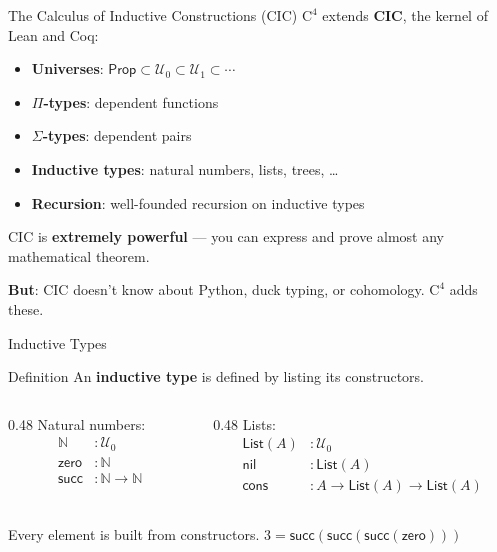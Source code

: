 \documentclass[aspectratio=169,11pt]{beamer}
\newcommand{\Cfour}{\mathrm{C}^4}
\begin{document}
\begin{frame}{The Calculus of Inductive Constructions (CIC)}
$\Cfour$ extends \textbf{CIC}, the kernel of Lean and Coq:

\vspace{0.5em}
\begin{itemize}
\item \textbf{Universes}: $\mathsf{Prop} \subset \mathcal{U}_0 \subset \mathcal{U}_1 \subset \cdots$
\item \textbf{$\Pi$-types}: dependent functions
\item \textbf{$\Sigma$-types}: dependent pairs
\item \textbf{Inductive types}: natural numbers, lists, trees, \ldots
\item \textbf{Recursion}: well-founded recursion on inductive types
\end{itemize}

\vspace{0.5em}
CIC is \textbf{extremely powerful} --- you can express and prove
almost any mathematical theorem.

\textbf{But}: CIC doesn't know about Python, duck typing, or
cohomology.  $\Cfour$ adds these.
\end{frame}

\begin{frame}{Inductive Types}
\begin{block}{Definition}
An \textbf{inductive type} is defined by listing its constructors.
\end{block}

\vspace{0.5em}
\begin{columns}
\begin{column}{0.48\textwidth}
Natural numbers:
\begin{align*}
\mathbb{N} &: \mathcal{U}_0 \\
\mathsf{zero} &: \mathbb{N} \\
\mathsf{succ} &: \mathbb{N} \to \mathbb{N}
\end{align*}
\end{column}
\begin{column}{0.48\textwidth}
Lists:
\begin{align*}
\mathsf{List}(A) &: \mathcal{U}_0 \\
\mathsf{nil} &: \mathsf{List}(A) \\
\mathsf{cons} &: A \to \mathsf{List}(A) \to \mathsf{List}(A)
\end{align*}
\end{column}
\end{columns}

\vspace{0.5em}
Every element is built from constructors.
$3 = \mathsf{succ}(\mathsf{succ}(\mathsf{succ}(\mathsf{zero})))$
\end{frame}
\end{document}
